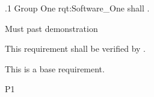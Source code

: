 \ONERQMTV
{\RqtNumberBase.1}
{Group One}
{rqt:Software_One}
{\ThisSys shall \TBD.}
{
	\item [Phase 1] Must past demonstration
}
{This requirement shall be verified by \TBD.}
{
\item [N/A] This is a base requirement.
}
{
	\item \TBD
}
{P1}

